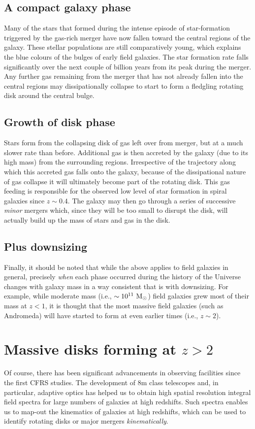 \documentclass[11pt]{article}
\begin{document}
\subsection{A compact galaxy phase}
Many of the stars that formed during the intense episode of
star-formation triggered by the gas-rich merger have now fallen toward
the central regions of the galaxy. These stellar populations are still
comparatively young, which explains the blue colours of the bulges of
early field galaxies. The star formation rate falls significantly over
the next couple of billion years from its peak during the merger. Any
further gas remaining from the merger that has not already fallen into
the central regions may dissipationally collapse to start to form a
fledgling rotating disk around the central bulge.

\subsection{Growth of disk phase}
Stars form from the collapsing disk of gas left over from merger, but
at a much slower rate than before. Additional gas is then accreted by
the galaxy (due to its high mass) from the surrounding
regions. Irrespective of the trajectory along which this accreted gas
falls onto the galaxy, because of the dissipational nature of gas
collapse it will ultimately become part of the rotating disk. This gas
feeding is responsible for the observed low level of star formation in
spiral galaxies since $z\sim0.4$.  The galaxy may then go through a
series of successive {\it minor} mergers which, since they will be too
small to disrupt the disk, will actually build up the mass of stars
and gas in the disk.

\subsection{Plus downsizing}
Finally, it should be noted that while the above applies to field
galaxies in general, precisely {\it when} each phase occurred during
the history of the Universe changes with galaxy mass in a way
consistent that is with downsizing. For example, while moderate mass
(i.e., $\sim10^{11}~{\rm M_\odot}$) field galaxies grew most of their
mass at $z<1$, it is thought that the most massive field galaxies
(such as Andromeda) will have started to form at even earlier times
(i.e., $z\sim2$).

\section{Massive disks forming at $z>2$} 
Of course, there has been significant advancements in observing
facilities since the first CFRS studies. The development of 8m class
telescopes and, in particular, adaptive optics has helped us to obtain
high spatial resolution integral field spectra for large numbers of
galaxies at high redshifts. Such spectra enables us to map-out the
kinematics of galaxies at high redshifts, which can be used to
identify rotating disks or major mergers {\it kinematically}.
\end{document}
